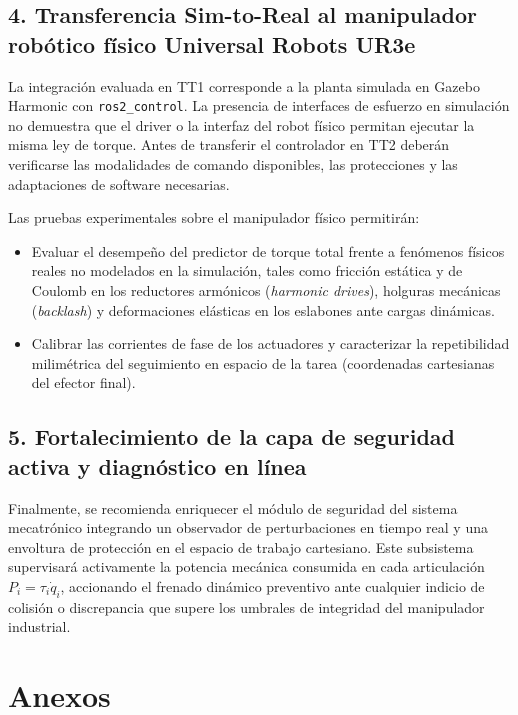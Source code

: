 \documentclass[12pt]{article}
\begin{document}
\subsection*{4. Transferencia Sim-to-Real al manipulador robótico físico Universal Robots UR3e}

La integración evaluada en TT1 corresponde a la planta simulada en Gazebo Harmonic con \texttt{ros2\_control}. La presencia de interfaces de esfuerzo en simulación no demuestra que el driver o la interfaz del robot físico permitan ejecutar la misma ley de torque. Antes de transferir el controlador en TT2 deberán verificarse las modalidades de comando disponibles, las protecciones y las adaptaciones de software necesarias.

Las pruebas experimentales sobre el manipulador físico permitirán:
\begin{itemize}
    \item Evaluar el desempeño del predictor de torque total frente a fenómenos físicos reales no modelados en la simulación, tales como fricción estática y de Coulomb en los reductores armónicos (\textit{harmonic drives}), holguras mecánicas (\textit{backlash}) y deformaciones elásticas en los eslabones ante cargas dinámicas.
    \item Calibrar las corrientes de fase de los actuadores y caracterizar la repetibilidad milimétrica del seguimiento en espacio de la tarea (coordenadas cartesianas del efector final).
\end{itemize}

\subsection*{5. Fortalecimiento de la capa de seguridad activa y diagnóstico en línea}

Finalmente, se recomienda enriquecer el módulo de seguridad del sistema mecatrónico integrando un observador de perturbaciones en tiempo real y una envoltura de protección en el espacio de trabajo cartesiano. Este subsistema supervisará activamente la potencia mecánica consumida en cada articulación $P_i = \tau_i \dot{q}_i$, accionando el frenado dinámico preventivo ante cualquier indicio de colisión o discrepancia que supere los umbrales de integridad del manipulador industrial.



\newpage
{}
\section*{Anexos}
\label{sec:administracion_proyecto_listas}
\end{document}
